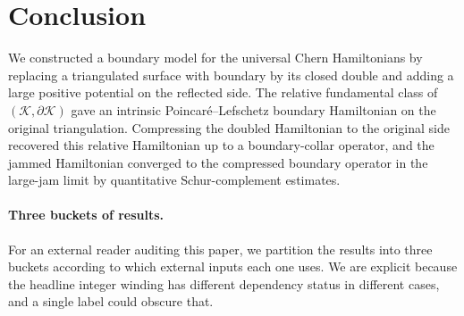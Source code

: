 \documentclass[11pt]{article}
\numberwithin{equation}{section}
\theoremstyle{definition}
\theoremstyle{remark}
\newcommand{\K}{\mathcal{K}}
\newcommand{\bd}{\partial}
\begin{document}
\section{Conclusion}

We constructed a boundary model for the universal Chern Hamiltonians by replacing a triangulated
surface with boundary by its closed double and adding a large positive potential on the reflected
side. The relative fundamental class of \((\K,\bd\K)\) gave an intrinsic Poincar\'e--Lefschetz
boundary Hamiltonian on the original triangulation. Compressing the doubled Hamiltonian to the
original side recovered this relative Hamiltonian up to a boundary-collar operator, and the
jammed Hamiltonian converged to the compressed boundary operator in the large-jam limit by
quantitative Schur-complement estimates.

\paragraph{Three buckets of results.} For an external reader auditing this paper, we partition
the results into three buckets according to which external inputs each one uses. We are explicit
because the headline integer winding has different dependency status in different cases, and a
single label could obscure that.
\end{document}
